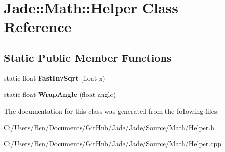 \hypertarget{class_jade_1_1_math_1_1_helper}{}\section{Jade\+:\+:Math\+:\+:Helper Class Reference}
\label{class_jade_1_1_math_1_1_helper}
\subsection*{Static Public Member Functions}
\begin{DoxyCompactItemize}
\item 
\hypertarget{class_jade_1_1_math_1_1_helper_a659eb850509ac325edf5f9f43745cffd}{}static float {\bfseries Fast\+Inv\+Sqrt} (float x)\label{class_jade_1_1_math_1_1_helper_a659eb850509ac325edf5f9f43745cffd}

\item 
\hypertarget{class_jade_1_1_math_1_1_helper_a81040c88535f64bc41143ad3be058c74}{}static float {\bfseries Wrap\+Angle} (float angle)\label{class_jade_1_1_math_1_1_helper_a81040c88535f64bc41143ad3be058c74}

\end{DoxyCompactItemize}


The documentation for this class was generated from the following files\+:\begin{DoxyCompactItemize}
\item 
C\+:/\+Users/\+Ben/\+Documents/\+Git\+Hub/\+Jade/\+Jade/\+Source/\+Math/Helper.\+h\item 
C\+:/\+Users/\+Ben/\+Documents/\+Git\+Hub/\+Jade/\+Jade/\+Source/\+Math/Helper.\+cpp\end{DoxyCompactItemize}

